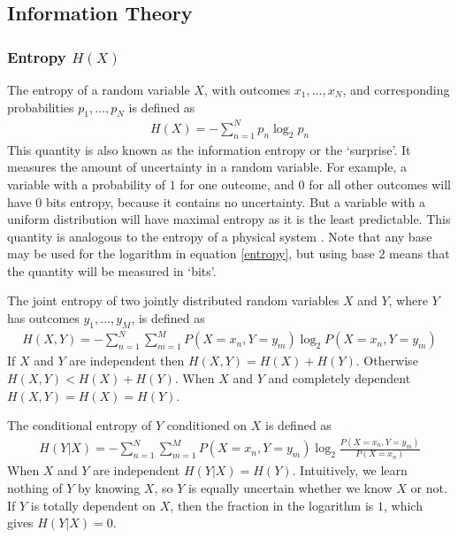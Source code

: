 \documentclass[a4paper,12pt]{article}
\theoremstyle{definition}
\begin{document}
    \subsection{Information Theory}\label{sec:information_theory}
        \subsubsection{Entropy $H(X)$}
        The entropy of a random variable $X$, with outcomes $x_1, \dots, x_N$, and corresponding probabilities $p_1, \dots, p_N$ is defined as
        \begin{align}\label{entropy}
        H(X) = -\sum_{n=1}^N p_n \log _2 p_n
        \end{align}
        This quantity is also known as the information entropy or the `surprise'. It measures the amount of uncertainty in a random variable. For example, a variable with a probability of $1$ for one outcome, and $0$ for all other outcomes will have 0 bits entropy, because it contains no uncertainty. But a variable with a uniform distribution will have maximal entropy as it is the least predictable. This quantity is analogous to the entropy of a physical system \cite{shannon}. Note that any base may be used for the logarithm in equation \ref{entropy}, but using base $2$ means that the quantity will be measured in `bits'.

        The joint entropy of two jointly distributed random variables $X$ and $Y$, where $Y$ has outcomes $y_1, \dots, y_M$, is defined as
        \begin{align}\label{joint_entropy}
        H(X, Y) = -\sum_{n=1}^N \sum_{m=1}^M P(X=x_n, Y=y_m) \log _2 P(X=x_n, Y=y_m)
        \end{align}
        If $X$ and $Y$ are independent then $H(X,Y) = H(X) + H(Y)$. Otherwise $H(X,Y) < H(X) + H(Y)$. When $X$ and $Y$ and completely dependent $H(X,Y) = H(X) = H(Y)$.

        The conditional entropy of $Y$ conditioned on $X$ is defined as
        \begin{align}
        H(Y|X) = -\sum_{n=1}^N \sum_{m=1}^M P(X=x_n, Y=y_m) \log _2 \frac{P(X=x_n, Y=y_m)}{P(X=x_n)}
        \end{align}
        When $X$ and $Y$ are independent $H(Y|X) = H(Y)$. Intuitively, we learn nothing of $Y$ by knowing $X$, so $Y$ is equally uncertain whether we know $X$ or not. If $Y$ is totally dependent on $X$, then the fraction in the logarithm is $1$, which gives $H(Y|X) = 0$.
\end{document}

